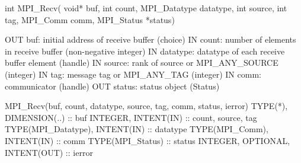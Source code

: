 int MPI_Recv(
  void* buf, int count, MPI_Datatype datatype,
  int source, int tag, MPI_Comm comm, MPI_Status *status)

OUT buf: initial address of receive buffer (choice)
IN count: number of elements in receive buffer (non-negative integer)
IN datatype: datatype of each receive buffer element (handle)
IN source: rank of source or MPI_ANY_SOURCE (integer)
IN tag: message tag or MPI_ANY_TAG (integer)
IN comm: communicator (handle)
OUT status: status object (Status)

MPI_Recv(buf, count, datatype, source, tag, comm, status, ierror)
TYPE(*), DIMENSION(..) :: buf
INTEGER, INTENT(IN) :: count, source, tag
TYPE(MPI_Datatype), INTENT(IN) :: datatype
TYPE(MPI_Comm), INTENT(IN) :: comm
TYPE(MPI_Status) :: status
INTEGER, OPTIONAL, INTENT(OUT) :: ierror
